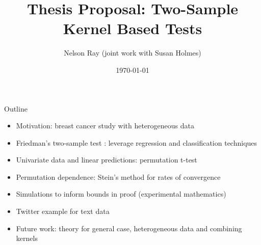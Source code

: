 \documentclass{beamer}
\begin{document}
\title[Two-Sample Kernel Tests]{Thesis Proposal: Two-Sample Kernel Based Tests}
\author[N. Ray with S. Holmes]{Nelson Ray (joint work with Susan
  Holmes)}
\date{\today}

\begin{frame}
  \titlepage
\end{frame}


\begin{frame}{Outline}
  \begin{itemize}
  \item Motivation: breast cancer study with heterogeneous data \pause
  \item Friedman's two-sample test \cite{friedman30908multivariate}:
    leverage regression and classification techniques \pause
  \item Univariate data and linear predictions: permutation t-test \pause
  \item Permutation dependence: Stein's method for rates of
    convergence \pause
  \item Simulations to inform bounds in proof (experimental
    mathematics) \pause
  \item Twitter example for text data \pause
  \item Future work: theory for general case, heterogeneous data and
    combining kernels
  \end{itemize}
\end{frame}
\end{document}
